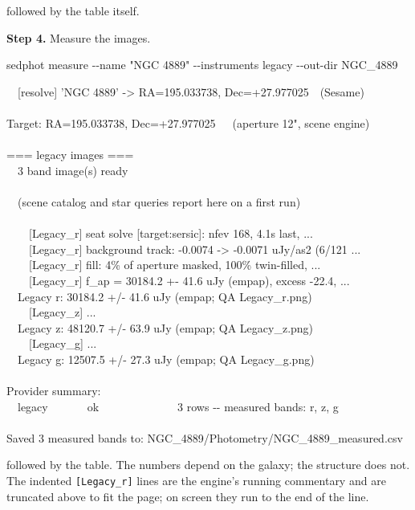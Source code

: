 \documentclass[11pt]{article}
\newcommand{\cmdline}[1]{\begin{cmd}\ttfamily #1\end{cmd}}
\begin{document}
followed by the table itself.

\textbf{Step 4.} Measure the images.

\cmdline{sedphot measure -{}-name "NGC 4889" -{}-instruments legacy -{}-out-dir NGC\_4889}

\begin{cmd}\ttfamily\frenchspacing
\mbox{}~~[resolve] 'NGC 4889' -> RA=195.033738, Dec=+27.977025~~(Sesame)\\
\mbox{}\\
Target: RA=195.033738, Dec=+27.977025~~~(aperture 12", scene engine)\\
\mbox{}\\
=== legacy images ===\\
\mbox{}~~3 band image(s) ready\\
\mbox{}\\
\mbox{}~~(scene catalog and star queries report here on a first run)\\
\mbox{}\\
\mbox{}~~~~[Legacy\_r] seat solve [target:sersic]: nfev 168, 4.1s last, ...\\
\mbox{}~~~~[Legacy\_r] background track: -0.0074 -> -0.0071 uJy/as2 (6/121 ...\\
\mbox{}~~~~[Legacy\_r] fill: 4\% of aperture masked, 100\% twin-filled, ...\\
\mbox{}~~~~[Legacy\_r] f\_ap = 30184.2 +- 41.6 uJy (empap), excess -22.4, ...\\
\mbox{}~~Legacy r: 30184.2 +/- 41.6 uJy (empap; QA Legacy\_r.png)\\
\mbox{}~~~~[Legacy\_z] ...\\
\mbox{}~~Legacy z: 48120.7 +/- 63.9 uJy (empap; QA Legacy\_z.png)\\
\mbox{}~~~~[Legacy\_g] ...\\
\mbox{}~~Legacy g: 12507.5 +/- 27.3 uJy (empap; QA Legacy\_g.png)\\
\mbox{}\\
Provider summary:\\
\mbox{}~~legacy~~~~~~~ok~~~~~~~~~~~~~~3 rows -{}- measured bands: r, z, g\\
\mbox{}\\
Saved 3 measured bands to: NGC\_4889/Photometry/NGC\_4889\_measured.csv
\end{cmd}

followed by the table. The numbers depend on the galaxy; the structure
does not. The indented \texttt{[Legacy\_r]} lines are the engine's running
commentary and are truncated above to fit the page; on screen they run to
the end of the line.
\end{document}
